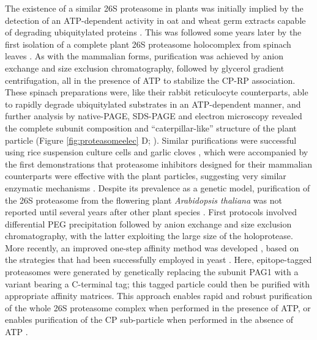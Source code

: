 The existence of a similar 26S proteasome in plants was initially implied by the detection of an ATP-dependent activity in oat and wheat germ extracts capable of degrading ubiquitylated proteins \citep{hatfield89, vierstra88}.  This was followed some years later by the first isolation of a complete plant 26S proteasome holocomplex from spinach leaves \citep{fujinami94}.  As with the mammalian forms, purification was achieved by anion exchange and size exclusion chromatography, followed by glycerol gradient centrifugation, all in the presence of ATP to stabilize the CP-RP association.  These spinach preparations were, like their rabbit reticulocyte counterparts, able to rapidly degrade ubiquitylated substrates in an ATP-dependent manner, and further analysis by native-PAGE, SDS-PAGE and electron microscopy revealed the complete subunit composition and ``caterpillar-like'' structure of the plant particle (Figure \ref{fig:proteasomeelec} D; \citep{fujinami94}).  Similar purifications were successful using rice suspension culture cells and garlic cloves \citep{malik04, yanagawa99}, which were accompanied by the first demonstrations that proteasome inhibitors designed for their mammalian counterparts were effective with the plant particles, suggesting very similar enzymatic mechanisms \citep{ozaki92, woffenden98}.  
Despite its prevalence as a genetic model, purification of the 26S proteasome from the flowering plant \textit{Arabidopsis thaliana} was not reported until several years after other plant species \citep{yang04}.  First protocols involved differential PEG precipitation followed by anion exchange and size exclusion chromatography, with the latter exploiting the large size of the holoprotease.  More recently, an improved one-step affinity method was developed \citep{book10}, based on the strategies that had been successfully employed in yeast \citep{leggett05}.  Here, epitope-tagged proteasomes were generated by genetically replacing the subunit PAG1 with a variant bearing a C-terminal tag; this tagged particle could then be purified with appropriate affinity matrices.  This approach enables rapid and robust purification of the whole 26S proteasome complex when performed in the presence of ATP, or enables purification of the CP sub-particle when performed in the absence of ATP \citep{book10}. 
